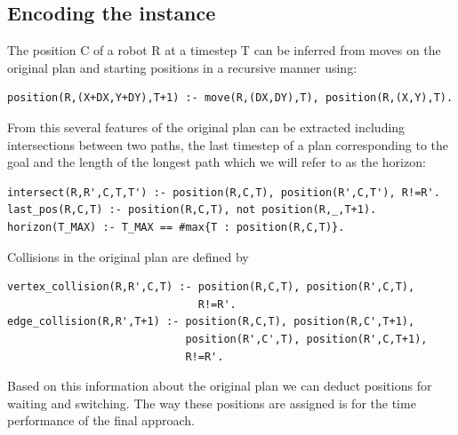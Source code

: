 \documentclass{llncs}
\begin{document}
\subsection{Encoding the instance}
The position C of a robot R at a timestep T can be inferred from moves on the original plan and starting positions in a recursive manner using:
\begin{verbatim}
position(R,(X+DX,Y+DY),T+1) :- move(R,(DX,DY),T), position(R,(X,Y),T).  
 \end{verbatim}
From this several features of the original plan can be extracted including intersections between two paths, the last timestep of a plan corresponding to the goal and the length of the longest path which we will refer to as the horizon:
\begin{verbatim}
intersect(R,R',C,T,T') :- position(R,C,T), position(R',C,T'), R!=R'.
last_pos(R,C,T) :- position(R,C,T), not position(R,_,T+1).
horizon(T_MAX) :- T_MAX == #max{T : position(R,C,T)}.
\end{verbatim}
Collisions in the original plan are defined by 
\begin{verbatim}
vertex_collision(R,R',C,T) :- position(R,C,T), position(R',C,T), 
                              R!=R'.
edge_collision(R,R',T+1) :- position(R,C,T), position(R,C',T+1),   
                            position(R',C',T), position(R',C,T+1), 
                            R!=R'.
\end{verbatim}
Based on this information about the original plan we can deduct positions for waiting and switching. The way these positions are assigned is for the time performance of the final approach.
\end{document}
